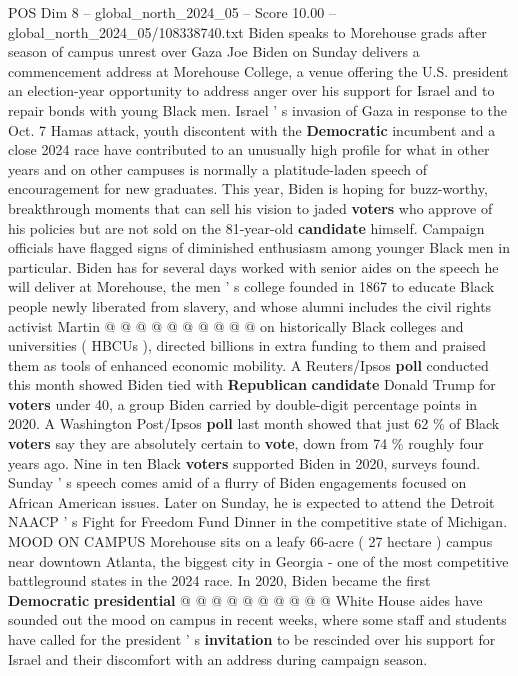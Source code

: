 \begin{textsample}{POS Dim 8 – global\_north\_2024\_05 – Score 10.00 – global\_north\_2024\_05/108338740.txt}  \label{ex:f8_pos_074}
Biden speaks to Morehouse grads after season of campus unrest over Gaza Joe Biden on Sunday delivers a commencement address at Morehouse College, a venue offering the U.S. president an election-year opportunity to address anger over his support for Israel and to repair bonds with young Black men.
Israel ' s invasion of Gaza in response to the Oct. 7 Hamas attack, youth discontent with the \textbf{Democratic} incumbent and a close 2024 race have contributed to an unusually high profile for what in other years and on other campuses is normally a platitude-laden speech of encouragement for new graduates.
This year, Biden is hoping for buzz-worthy, breakthrough moments that can sell his vision to jaded \textbf{voters} who approve of his policies but are not sold on the 81-year-old \textbf{candidate} himself.
Campaign officials have flagged signs of diminished enthusiasm among younger Black men in particular.
Biden has for several days worked with senior aides on the speech he will deliver at Morehouse, the men ' s college founded in 1867 to educate Black people newly liberated from slavery, and whose alumni includes the civil rights activist Martin @ @ @ @ @ @ @ @ @ @ on historically Black colleges and universities ( HBCUs ), directed billions in extra funding to them and praised them as tools of enhanced economic mobility.
A Reuters/Ipsos \textbf{poll} conducted this month showed Biden tied with \textbf{Republican} \textbf{candidate} Donald Trump for \textbf{voters} under 40, a group Biden carried by double-digit percentage points in 2020.
A Washington Post/Ipsos \textbf{poll} last month showed that just 62 \% of Black \textbf{voters} say they are absolutely certain to \textbf{vote}, down from 74 \% roughly four years ago.
Nine in ten Black \textbf{voters} supported Biden in 2020, surveys found.
Sunday ' s speech comes amid of a flurry of Biden engagements focused on African American issues.
Later on Sunday, he is expected to attend the Detroit NAACP ' s Fight for Freedom Fund Dinner in the competitive state of Michigan.
MOOD ON CAMPUS Morehouse sits on a leafy 66-acre ( 27 hectare ) campus near downtown Atlanta, the biggest city in Georgia - one of the most competitive battleground states in the 2024 race.
In 2020, Biden became the first \textbf{Democratic} \textbf{presidential} @ @ @ @ @ @ @ @ @ @ White House aides have sounded out the mood on campus in recent weeks, where some staff and students have called for the president ' s \textbf{invitation} to be rescinded over his support for Israel and their discomfort with an address during campaign season.

\end{textsample}
